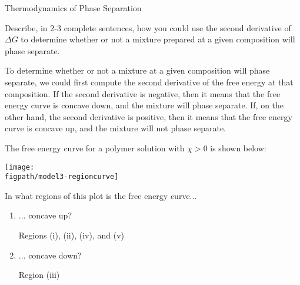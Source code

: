 \begin{activity}{Thermodynamics of Phase Separation}
\begin{ctqs}
		\question Describe, in 2-3 complete sentences, how you could use the second derivative of $\Delta G$ to determine whether or not a mixture prepared at a given composition will phase separate.
					
					\begin{solution}[3in]
					
						To determine whether or not a mixture at a given composition will phase separate, we could first compute the second derivative of the free energy at that composition.  If the second derivative is negative, then it means that the free energy curve is concave down, and the mixture will phase separate.  If, on the other hand, the second derivative is positive, then it means that the free energy curve is concave up, and the mixture will not phase separate.
					
					\end{solution}
					
\end{ctqs}

\clearpage
\begin{model}
\label{\labelbase:mdl:phaseboundaries}

The free energy curve for a polymer solution with $\chi > 0$ is shown below:

\centerline{\texttt{[image: \\figpath/model3-regioncurve]}}

\end{model}

\begin{ctqs}

		\question \label{ctq:regionconcavity} In what regions of this plot is the free energy curve...
			\begin{enumerate}
				\item ... concave up?
					
					\begin{solution}[0.75in]
					
						Regions (i), (ii), (iv), and (v)
						
					\end{solution}
				\item ... concave down?
					
					\begin{solution}[0.75in]
					
						Region (iii)
						
					\end{solution}
					

\end{enumerate}
\end{ctqs}
\end{activity}
